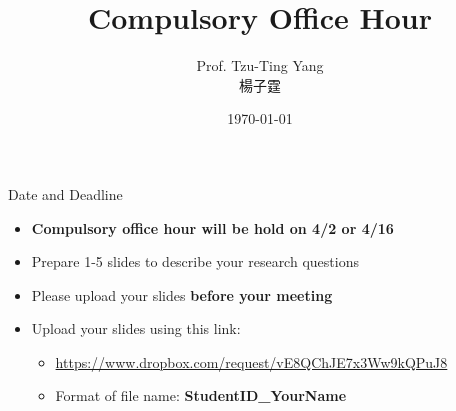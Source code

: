 \documentclass[dvipsnames,hyperref={pdfpagelabels=false}]{beamer}
\title[]  
{Compulsory Office Hour}
\author 
{Prof. Tzu-Ting Yang  \\ 楊子霆}
\institute{Institute of Economics, Academia Sinica  \\ 中央研究院經濟研究所}
\date
{\today}
\begin{document}
\begin{frame}{}
 \titlepage
\end{frame}



\begin{frame}{Date and Deadline}
\begin{itemize} 
\item \textbf{Compulsory office hour will be hold on 4/2 or 4/16} 
\vspace{0.2cm}
\item Prepare 1-5 slides to describe your research questions 
\vspace{0.2cm}
\item Please upload your slides \textbf{before your meeting}
\vspace{0.2cm}
\item Upload your slides using this link:
\vspace{0.2cm}
\begin{itemize} 
\item \url{https://www.dropbox.com/request/vE8QChJE7x3Ww9kQPuJ8}
	\vspace{0.2cm}
\item Format of file name: \textbf{StudentID\_YourName}
\vspace{0.2cm}

\end{itemize}

\end{itemize}
\end{frame}
\end{document}
